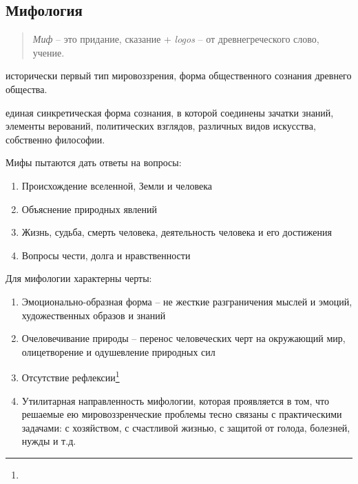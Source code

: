 \documentclass[
]{article}
\providecommand{\tightlist}{%
  \setlength{\itemsep}{0pt}\setlength{\parskip}{0pt}}
\begin{document}
\hypertarget{ux43cux438ux444ux43eux43bux43eux433ux438ux44f}{%
\subsection{Мифология}\label{ux43cux438ux444ux43eux43bux43eux433ux438ux44f}}

\begin{quote}
\emph{Миф} -- это придание, сказание + \emph{logos} -- от
древнегреческого слово, учение.
\end{quote}

\begin{description}
\tightlist
\item[\emph{Мифология} ---]
исторически первый тип мировоззрения, форма общественного сознания
древнего общества.
\item[\emph{Миф} ---]
единая синкретическая форма сознания, в которой соединены зачатки
знаний, элементы верований, политических взглядов, различных видов
искусства, собственно философии.
\end{description}

Мифы пытаются дать ответы на вопросы:

\begin{enumerate}
\def\labelenumi{\arabic{enumi}.}
\tightlist
\item
  Происхождение вселенной, Земли и человека
\item
  Объяснение природных явлений
\item
  Жизнь, судьба, смерть человека, деятельность человека и его достижения
\item
  Вопросы чести, долга и нравственности
\end{enumerate}

Для мифологии характерны черты:

\begin{enumerate}
\def\labelenumi{\arabic{enumi}.}
\tightlist
\item
  Эмоционально-образная форма -- не жесткие разграничения мыслей и
  эмоций, художественных образов и знаний
\item
  Очеловечивание природы -- перенос человеческих черт на окружающий мир,
  олицетворение и одушевление природных сил
\item
  Отсутствие рефлексии\footnote{}
\item
  Утилитарная направленность мифологии, которая проявляется в том, что
  решаемые ею мировоззренческие проблемы тесно связаны с практическими
  задачами: с хозяйством, с счастливой жизнью, с защитой от голода,
  болезней, нужды и т.д.
\end{enumerate}
\end{document}

